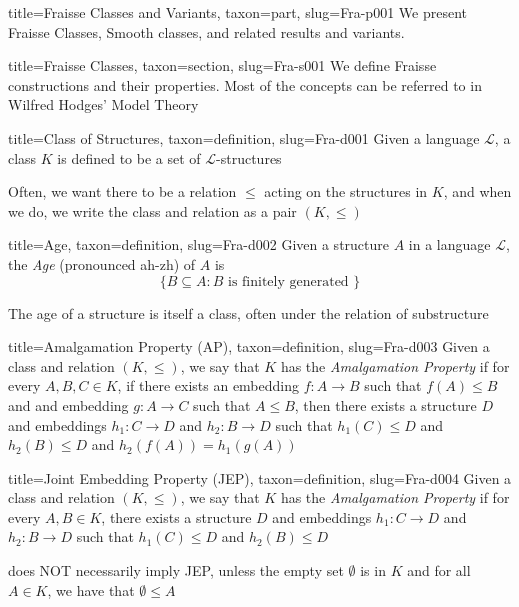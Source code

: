 \documentclass[a4paper]{article}
\begin{document}
  
  
\begin{tree}{title={Fraisse Classes and Variants}, taxon={part}, slug={Fra-p001}}
We present Fraisse Classes, Smooth classes, and related results and variants.
\begin{tree}{title={Fraisse Classes}, taxon={section}, slug={Fra-s001}}
We define Fraisse constructions and their properties. Most of the concepts can be referred to in Wilfred Hodges' Model Theory~\cite{Ref-0001}
\begin{tree}{title={Class of Structures}, taxon={definition}, slug={Fra-d001}}
Given a language \(\mathcal {L}\), a class \(K\) is defined to be a set of \(\mathcal {L}\)-structures\par{Often, we want there to be a relation \(\leq\) acting on the structures in \(K\), and when we do, we write the class and relation as a pair \((K,  \leq )\)}
\end{tree}

\begin{tree}{title={Age}, taxon={definition}, slug={Fra-d002}}
Given a structure \(A\) in a language \(\mathcal {L}\), the \emph{Age} (pronounced ah-zh) of \(A\) is \[\{ B \subseteq  A: B  \text { is finitely generated } \}\]\par{The age of a structure is itself a class, often under the relation of substructure}
\end{tree}

\begin{tree}{title={Amalgamation Property (AP)}, taxon={definition}, slug={Fra-d003}}
Given a class and relation \((K, \leq )\), we say that \(K\) has the \emph{Amalgamation Property} if for every \(A,B,C  \in  K\), if there 
exists an embedding \(f:A \rightarrow  B\) such that \(f(A)  \leq  B\) and and embedding \(g:A \rightarrow  C\) such that \(A \leq  B\), then there exists a structure \(D\) 
and embeddings \(h_1:C \rightarrow  D\) and \(h_2:B \rightarrow  D\) such that \(h_1(C) \leq  D\) and \(h_2(B)  \leq  D\) and \(h_2(f(A)) = h_1(g(A))\)
\end{tree}

\begin{tree}{title={Joint Embedding Property (JEP)}, taxon={definition}, slug={Fra-d004}}
Given a class and relation \((K, \leq )\), we say that \(K\) has the \emph{Amalgamation Property} if for every \(A,B  \in  K\), there exists a structure \(D\) 
and embeddings \(h_1:C \rightarrow  D\) and \(h_2:B \rightarrow  D\) such that \(h_1(C) \leq  D\) and \(h_2(B)  \leq  D\)\par{ does NOT necessarily imply JEP, unless the empty set \(\emptyset\) is in \(K\) and for all \(A \in  K\), we have that \(\emptyset   \leq  A\)}
\end{tree}


\end{tree}
\end{tree}
\end{document}
